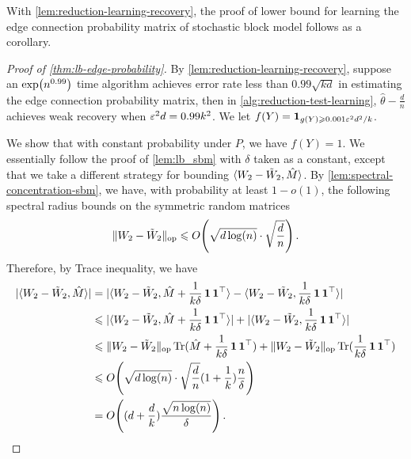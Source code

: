 With \cref{lem:reduction-learning-recovery}, the proof of lower bound for learning the edge connection probability matrix of stochastic block model follows as a corollary.
\begin{proof}[Proof of \cref{thm:lb-edge-probability}]
    By \cref{lem:reduction-learning-recovery}, suppose an $\exp\Paren{n^{0.99}}$ time algorithm achieves error rate less than $0.99\sqrt{kd}$ in estimating the edge connection probability matrix, then in \cref{alg:reduction-test-learning}, $\hat{\theta}-\frac{d}{n}$ achieves weak recovery when $\varepsilon^2 d=0.99k^2$.
    We let $f(Y)=\mathbf{1}_{g(Y)\geqslant 0.001 \varepsilon^2 d^2/k}$. 

    We show that with constant probability under $P$, we have $f(Y)=1$.    
    We essentially follow the proof of \cref{lem:lb_sbm} with $\delta$ taken as a constant, except that we take a different strategy for bounding
    $\langle W_2-\tilde{W}_2, \hat{M}\rangle$.
    By \cref{lem:spectral-concentration-sbm}, we have, with probability at least $1-o(1)$, the following spectral radius bounds on the symmetric random matrices
\begin{equation*}
    \normop{W_2-\tilde{W}_2}\leq O\Paren{\sqrt{d\log(n)}\cdot \sqrt{\frac{d}{n}}}\,.
\end{equation*}
Therefore, by Trace inequality, we have
\begin{equation*}
\begin{split}
|\iprod{W_2-\tilde{W}_2, \hat{M}}|
& = |\iprod{W_2-\tilde{W}_2, \hat{M}+\frac{1}{k\delta}\Ind \Ind^{\top}} - \iprod{W_2-\tilde{W}_2, \frac{1}{k\delta}\Ind \Ind^{\top}}| \\
& \leq |\iprod{W_2-\tilde{W}_2, \hat{M}+\frac{1}{k\delta}\Ind \Ind^{\top}}| + |\iprod{W_2-\tilde{W}_2, \frac{1}{k\delta}\Ind \Ind^{\top}}| \\
& \leq \normop{W_2-\tilde{W}_2} \Tr(\hat{M}+\frac{1}{k\delta}\Ind \Ind^{\top}) + \normop{W_2-\tilde{W}_2} \Tr(\frac{1}{k\delta}\Ind \Ind^{\top}) \\
& \leq O\Paren{\sqrt{d\log(n)}\cdot \sqrt{\frac{d}{n}} (1+\frac{1}{k})\frac{n}{\delta}}\\
& = O\Paren{(d+\frac{d}{k})\frac{\sqrt{n\log(n)}}{\delta}} \,.
\end{split}
\end{equation*}


\end{proof}
